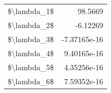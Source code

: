 \begin{tabular}{lr}
\hline
 \$\textbackslash{}lambda\_1\$ & 98.5669      \\
 \$\textbackslash{}lambda\_2\$ & -6.12269     \\
 \$\textbackslash{}lambda\_3\$ & -7.37165e-16 \\
 \$\textbackslash{}lambda\_4\$ &  9.40165e-16 \\
 \$\textbackslash{}lambda\_5\$ &  4.35256e-16 \\
 \$\textbackslash{}lambda\_6\$ &  7.59352e-16 \\
\hline
\end{tabular}
